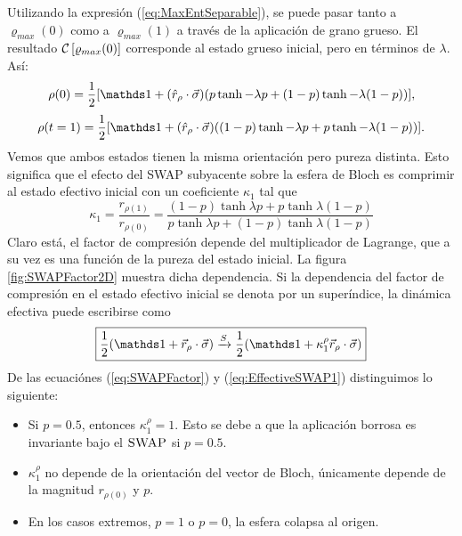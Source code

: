 Utilizando la expresión (\ref{eq:MaxEntSeparable}), se puede pasar tanto a $\varrho_{max}(0)$ como a $\varrho_{max}(1)$ a través de la aplicación de grano grueso. El resultado $\mathcal{C}\left[\varrho_{max}(0)\right]$ corresponde al estado grueso inicial, pero en términos de $\lambda$. Así:
\begin{equation}
\rho(0)=\frac{1}{2}[\Id+(\hat{r}_{\rho}\cdot\vec{\sigma})(p\tanh{-\lambda p}+(1-p)\tanh{-\lambda (1-p)})],
\end{equation}
\begin{equation}
\rho(t=1)=\frac{1}{2}[\Id+(\hat{r}_{\rho}\cdot\vec{\sigma})((1-p)\tanh{-\lambda p}+p\tanh{-\lambda (1-p)})].
\end{equation}
Vemos que ambos estados tienen la misma orientación pero pureza distinta. Esto significa que el efecto del \textsc{SWAP} subyacente sobre la esfera de Bloch es comprimir al estado efectivo inicial con un coeficiente $\kappa_{1}$ tal que
\begin{equation}\label{eq:SWAPFactor}
  \kappa_{1}=\frac{r_{\rho(1)}}{r_{\rho(0)}}=\frac{(1-p)\tanh{\lambda p}+p\tanh{\lambda (1-p)}}{
    p\tanh{\lambda p}+(1-p)\tanh{\lambda (1-p)}}
\end{equation}
Claro está, el factor de compresión depende del multiplicador de Lagrange, que a su vez es una función de la pureza del estado inicial. La figura \ref{fig:SWAPFactor2D} muestra dicha dependencia. Si la dependencia del factor de compresión en el estado efectivo inicial se denota por un superíndice, la dinámica efectiva puede escribirse como
\begin{equation}\label{eq:EffectiveSWAP1}
  \boxed{\frac{1}{2}(\Id+\vec{r}_{\rho}\cdot\vec{\sigma}) \xrightarrow{S} \frac{1}{2}(\Id+\kappa_{1}^{\rho}\vec{r}_{\rho}\cdot\vec{\sigma})}
\end{equation}
De las ecuaciónes (\ref{eq:SWAPFactor}) y (\ref{eq:EffectiveSWAP1}) distinguimos lo siguiente:
\begin{itemize}
  \item Si $p=0.5$, entonces $\kappa_{1}^{\rho}=1$. Esto se debe a que la aplicación borrosa es invariante bajo el $\textsc{SWAP}$ si $p=0.5$.
  \item $\kappa_{1}^{\rho}$ no depende de la orientación del vector de Bloch, únicamente depende de la magnitud $r_{\rho(0)}$ y $p$.
  \item En los casos extremos, $p=1$ o $p=0$, la esfera colapsa al origen.
\end{itemize}


